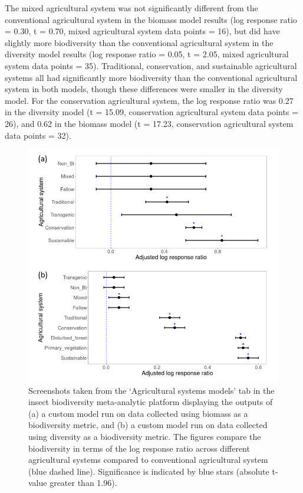 \documentclass[11pt]{article}
\begin{document}
			\noindent The mixed agricultural system was not significantly different from the conventional agricultural system in the biomass model results (log response ratio = 0.30, t = 0.70, mixed agricultural system data points = 16), but did have slightly more biodiversity than the conventional agricultural system in the diversity model results (log response ratio = 0.05, t = 2.05, mixed agricultural system data points = 35). Traditional, conservation, and sustainable agricultural systems all had significantly more biodiversity than the conventional agricultural system in both models, though these differences were smaller in the diversity model. For the conservation agricultural system, the log response ratio was 0.27 in the diversity model (t = 15.09, conservation agricultural system data points = 26), and 0.62 in the biomass model (t = 17.23, conservation agricultural system data points = 32). 
	
			\begin{figure}[H] 
				\centering 
				\includegraphics[scale=1]{figure_4_diversity_vs_biomass_models.png} 
				\caption{Screenshots taken from the ‘Agricultural systems models’ tab in the insect biodiversity meta-analytic platform displaying the outputs of (a) a custom model run on data collected using biomass as a biodiversity metric, and (b) a custom model run on data collected using diversity as a biodiversity metric. The figures compare the biodiversity in terms of the log response ratio across different agricultural systems compared to conventional agricultural system (blue dashed line). Significance is indicated by blue stars (absolute t-value greater than 1.96).}  
			\end{figure}
		
\end{document}
